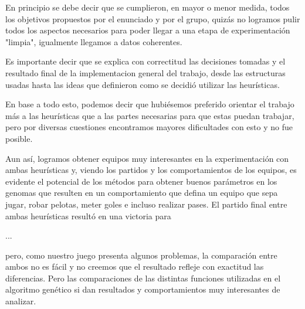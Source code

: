 

 En principio se debe decir que se cumplieron, en mayor o menor medida, todos los objetivos
 propuestos por el enunciado y por el grupo, quizás no logramos pulir todos los aspectos
 necesarios para poder llegar a una etapa de experimentación "limpia", igualmente llegamos
 a datos coherentes.

 Es importante decir que se explica con correctitud las decisiones tomadas y el resultado final
 de la implementacion general del trabajo, desde las estructuras usadas hasta las ideas que
 definieron como se decidió utilizar las heurísticas.

 En base a todo esto, podemos decir que hubiésemos preferido orientar el trabajo más a
 las heurísticas que a las partes necesarias para que estas puedan trabajar, pero por diversas
 cuestiones encontramos mayores dificultades con esto y no fue posible.

 Aun así, logramos obtener equipos muy interesantes en la experimentación con
 ambas heurísticas y, viendo los partidos y los comportamientos de los equipos, es evidente el potencial de los métodos
 para obtener buenos parámetros en los genomas que resulten en un comportamiento que defina un equipo que sepa jugar,
  robar pelotas, meter goles e incluso realizar pases.
 El partido final entre ambas heurísticas resultó en una victoria para

 ...

 pero,
  como nuestro juego presenta algunos problemas, la comparación entre ambos no es fácil
  y no creemos que el resultado refleje con exactitud las diferencias. Pero las comparaciones
  de las distintas funciones utilizadas en el algoritmo genético si dan resultados y comportamientos
  muy interesantes de analizar.
